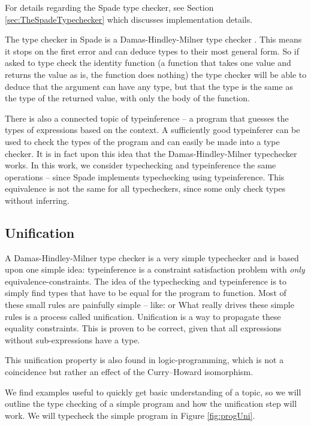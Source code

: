 For details regarding the Spade type checker, see Section \ref{sec:TheSpadeTypechecker} which discusses implementation details.

The type checker in Spade is a Damas-Hindley-Milner type checker \cite{src:DamasHindleyMilner}. This means it stops on the first error and can deduce types to their most general form. So if asked to type check the identity function (a function that takes one value and returns the value as is, the function does nothing) the type checker will be able to deduce that the argument can have any type, but that the type is the same as the type of the returned value, with only the body of the function.\cite{src:DamasHindleyMilner}

There is also a connected topic of typeinference -- a program that guesses the types of expressions based on the context. A sufficiently good typeinferer can be used to check the types of the program and can easily be made into a type checker. It is in fact upon this idea that the Damas-Hindley-Milner typechecker works. In this work, we consider typechecking and typeinference the same operations -- since Spade implements typechecking using typeinference. This equivalence is not the same for all typecheckers, since some only check types without inferring.

\subsection{Unification}
\label{sec:Unification}
A Damas-Hindley-Milner type checker is a very simple typechecker and is based upon one simple idea: typeinference is a constraint satisfaction problem with \textit{only} equivalence-constraints. The idea of the typechecking and typeinference is to simply find types that have to be equal for the program to function. Most of these small rules are painfully simple -- like:  or  What really drives these simple rules is a process called unification. Unification is a way to propagate these equality constraints. This is proven to be correct, given that all expressions without sub-expressions have a type.

This unification property is also found in logic-programming, which is not a coincidence but rather an effect of the Curry–Howard isomorphism. \cite{src:curryHowardIso}

We find examples useful to quickly get basic understanding of a topic, so we will outline the type checking of a simple program and how the unification step will work. We will typecheck the simple program in Figure \ref{fig:progUni}.

